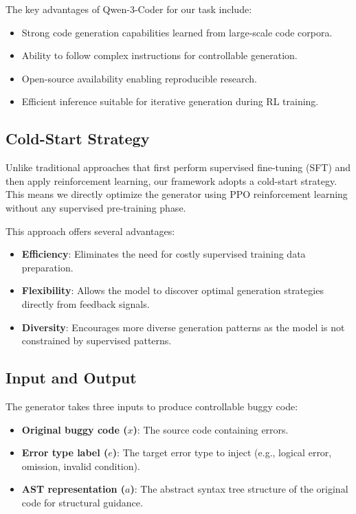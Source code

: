 The key advantages of Qwen-3-Coder for our task include:
\begin{itemize}
    \item Strong code generation capabilities learned from large-scale code corpora.
    \item Ability to follow complex instructions for controllable generation.
    \item Open-source availability enabling reproducible research.
    \item Efficient inference suitable for iterative generation during RL training.
\end{itemize}

\subsection{Cold-Start Strategy}

Unlike traditional approaches that first perform supervised fine-tuning (SFT) and then apply reinforcement learning, our framework adopts a cold-start strategy. This means we directly optimize the generator using PPO reinforcement learning without any supervised pre-training phase.

This approach offers several advantages:
\begin{itemize}
    \item \textbf{Efficiency}: Eliminates the need for costly supervised training data preparation.
    \item \textbf{Flexibility}: Allows the model to discover optimal generation strategies directly from feedback signals.
    \item \textbf{Diversity}: Encourages more diverse generation patterns as the model is not constrained by supervised patterns.
\end{itemize}

\subsection{Input and Output}

The generator takes three inputs to produce controllable buggy code:
\begin{itemize}
    \item \textbf{Original buggy code ($x$)}: The source code containing errors.
    \item \textbf{Error type label ($e$)}: The target error type to inject (e.g., logical error, omission, invalid condition).
    \item \textbf{AST representation ($a$)}: The abstract syntax tree structure of the original code for structural guidance.
\end{itemize}

